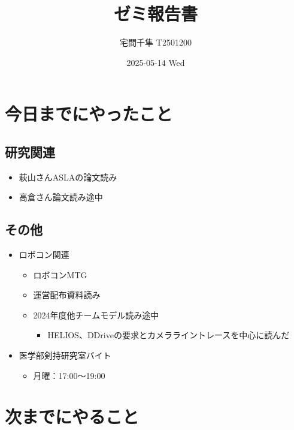\documentclass[uplatex, onecolumn, 10pt]{jsarticle}
\begin{document}
\title{\vspace{-40mm}\bf{\LARGE{ゼミ報告書}}}
\author{\vspace{-40mm}宅間千隼 T2501200}
\date{2025-05-14 Wed}
\maketitle


\section{今日までにやったこと}

\subsection*{研究関連} 
\begin{itemize}
	\item 萩山さんASLAの論文読み
	\item 高倉さん論文読み途中
\end{itemize}

\subsection*{その他}
\begin{itemize}
	\item ロボコン関連
	\begin{itemize}
		\item ロボコンMTG
		\item 運営配布資料読み
		\item 2024年度他チームモデル読み途中
		\begin{itemize}
			\item HELIOS、DDriveの要求とカメラライントレースを中心に読んだ
		\end{itemize}
	\end{itemize}
	\item 医学部剣持研究室バイト
	\begin{itemize}
		\item 月曜：17:00～19:00
	\end{itemize}
\end{itemize}


\section{次までにやること}
\end{document}
